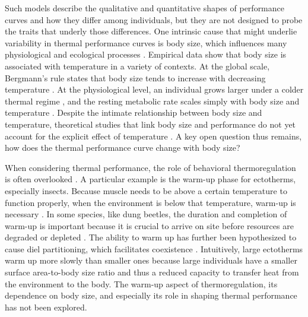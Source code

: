 Such models describe the qualitative and quantitative shapes of performance curves and how they differ among individuals, but they are not designed to probe the traits that underly those differences.
One intrinsic cause that might underlie variability in thermal performance curves is body size, which influences many physiological and ecological processes \citep{Calder1984,Schmidt1984,Peters1986}.
Empirical data show that body size is associated with temperature in a variety of contexts.
At the global scale, Bergmann's rule states that body size tends to increase with decreasing temperature \citep{Bergmann1847, Blackburn1999}.
At the physiological level, an individual grows larger under a colder thermal regime \citep{VanVoorhies1996}, and the resting metabolic rate scales simply with body size and temperature \citep{Kleiber1947, Peters1986, Gillooly2001, Brown2004}.
Despite the intimate relationship between body size and temperature, theoretical studies that link body size and performance do not yet account for the explicit effect of temperature \citep[e.g.,][]{Yodzis1992, Brown1993}.
A key open question thus remains, how does the thermal performance curve change with body size?

When considering thermal performance, the role of behavioral thermoregulation is often overlooked \citep{Kearney2009b}.
A particular example is the warm-up phase for ectotherms, especially insects.
Because muscle needs to be above a certain temperature to function properly, when the environment is below that temperature, warm-up is necessary \citep[e.g.,][]{Heinrich1975}.
In some species, like dung beetles, the duration and completion of warm-up is important because it is crucial to arrive on site before resources are degraded or depleted \citep{Hanski1991}. %
The ability to warm up has further been hypothesized to cause diel partitioning, which facilitates coexistence \citep{Viljanen2009}.
Intuitively, large ectotherms warm up more slowly than smaller ones because large individuals have a smaller surface area-to-body size ratio and thus a reduced capacity to transfer heat from the environment to the body.
The warm-up aspect of thermoregulation, its dependence on body size, and especially its role in shaping thermal performance has not been explored.

